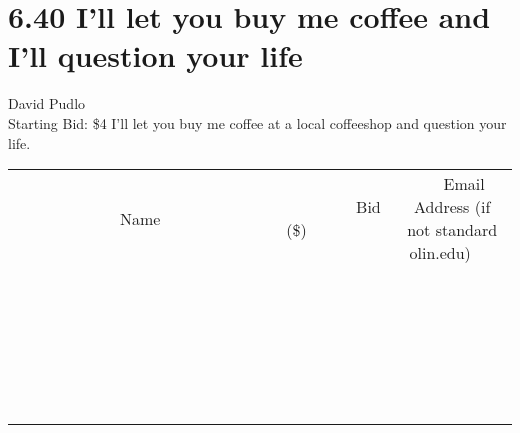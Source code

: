 \documentclass[11pt]{article}
\begin{document}
\section*{6.40 I'll let you buy me coffee and I'll question your life}
David Pudlo
\\
Starting Bid: \$4
\newline
I'll let you buy me coffee at a local coffeeshop and question your life.
\\[6ex]
\begin{tabular}{c c c}
~~~~~~~~~~~~~Name~~~~~~~~~~~~~ & ~~~~~~~~~Bid (\$)~~~~~~~~~  & ~~~Email Address (if not standard olin.edu)~~~\\
 & & \\
\hline
 & & \\
\hline
 & & \\
\hline
 & & \\
\hline
 & & \\
\hline
 & & \\
\hline
 & & \\
\hline
 & & \\
\hline
 & & \\
\hline
 & & \\
\hline
 & & \\
\hline
 & & \\
\hline
 & & \\
\hline
 & & \\
\hline
 & & \\
\hline
 & & \\
\hline
 & & \\
\hline
 & & \\
\hline
 & & \\
\hline
 & & \\
\hline
 & & \\
\hline
 & & \\
\hline
 & & \\
\hline
 & & \\
\hline
 & & \\
\hline
 & & \\
\hline
\end{tabular}
\newpage
\end{document}
